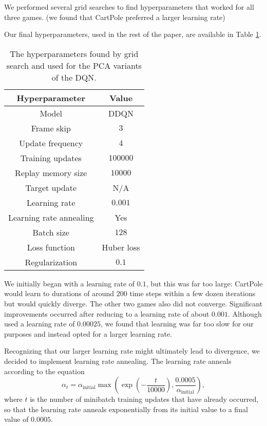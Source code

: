 \documentclass[11pt, twocolumn]{article}
\begin{document}
We performed several grid searches to find hyperparameters that worked for all three games. (we found that CartPole preferred a larger learning rate)

Our final hyperparameters, used in the rest of the paper, are available in Table \ref{tab:grid_search_hyperparameters}.

\begin{table}[!htbp]
    \centering
    \begin{tabular}{c|c}
        \toprule
        Hyperparameter & Value \\ \midrule
        Model & DDQN \\
        Frame skip & $3$ \\
        Update frequency & $4$ \\
        Training updates & $100000$ \\
        Replay memory size & $10000$ \\
        Target update & N/A \\
        Learning rate & $0.001$ \\
        Learning rate annealing & Yes \\
        Batch size & $128$ \\
        Loss function & Huber loss \\
        Regularization & $0.1$ \\
        \bottomrule
    \end{tabular}
    \caption{The hyperparameters found by grid search and used for the PCA variants of the DQN.}
    \label{tab:grid_search_hyperparameters}
\end{table}

We initially began with a learning rate of $0.1$, but this was far too large: CartPole would learn to durations of around 200 time steps within a few dozen iterations but would quickly diverge. The other two games also did not converge. Significant improvements occurred after reducing to a learning rate of about $0.001$. Although \cite{mnih2013playing, mnih2015human} used a learning rate of $0.00025$, we found that learning was far too slow for our purposes and instead opted for a larger learning rate. 

Recognizing that our larger learning rate might ultimately lead to divergence, we decided to implement learning rate annealing. The learning rate anneals according to the equation $$\alpha_t = \alpha_\text{initial} \max\left(\exp\left(-\frac{t}{10000}\right), \frac{0.0005}{\alpha_\text{initial}}\right),$$ where $t$ is the number of minibatch training updates that have already occurred, so that the learning rate anneals exponentially from its initial value to a final value of $0.0005$.
\end{document}

